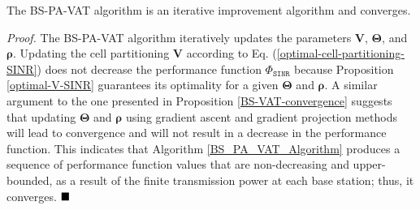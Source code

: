 \begin{Proposition}\label{BS-PA-VAT-convergence}
    The BS-PA-VAT algorithm is an iterative improvement algorithm and converges.
\end{Proposition}

{\it Proof. } The BS-PA-VAT algorithm iteratively updates the parameters $\bm{V}$, $\bm{\Theta}$, and $\bm{\rho}$. Updating the cell partitioning $\bm{V}$ according to Eq. (\ref{optimal-cell-partitioning-SINR}) does not decrease the performance function $\Phi_{\mathtt{SINR}}$ because Proposition \ref{optimal-V-SINR} guarantees its optimality for a given $\bm{\Theta}$ and $\bm{\rho}$. A similar argument to the one presented in Proposition \ref{BS-VAT-convergence} suggests that updating $\bm{\Theta}$ and $\bm{\rho}$ using gradient ascent and gradient projection methods will lead to convergence and will not result in a decrease in the performance function. This indicates that Algorithm \ref{BS_PA_VAT_Algorithm} produces a sequence of performance function values that are non-decreasing and upper-bounded, as a result of the finite transmission power at each base station; thus, it converges. $\hfill\blacksquare$